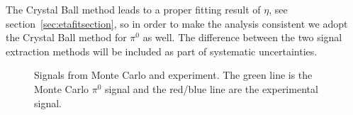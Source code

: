  The Crystal Ball method leads to a proper fitting result of $\eta$, see section~\ref{sec:etafitsection}, so in order to make the analysis consistent we adopt the Crystal Ball method for $\pi^0$ as well. The difference between the two signal extraction methods will be included as part of systematic uncertainties.
\begin{figure}
  \centering     
  \caption[Signals from Monte Carlo and experiment]{Signals from Monte Carlo and experiment. The green line is the Monte Carlo $\pi^0$ signal and the  red/blue line are the experimental signal.}
  \label{fig:pi0mcexpsig}
\end{figure}

